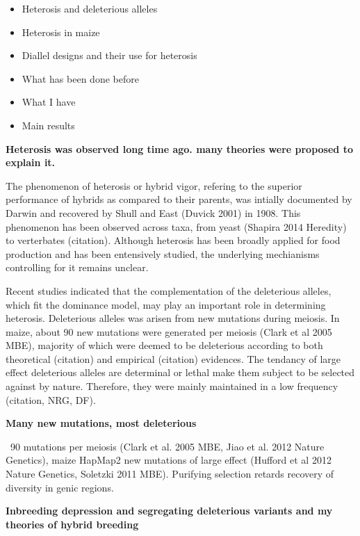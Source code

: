 \documentclass[10pt]{article}
\begin{document}
\begin{itemize}
  \item Heterosis and deleterious alleles
  \item Heterosis in maize
  \item Diallel designs and their use for heterosis
  \item What has been done before
  \item What I have
  \item  Main results
\end{itemize}



\textbf{Heterosis was observed long time ago. many theories were proposed to explain it.}


The phenomenon of heterosis or hybrid vigor, refering to the superior performance of hybrids as compared to their parents, was intially documented by Darwin and recovered by Shull and East (Duvick 2001) in 1908. This phenomenon has been observed across taxa, from yeast (Shapira 2014 Heredity) to verterbates (citation). Although heterosis has been broadly applied for food production and has been entensively studied, the underlying mechianisms controlling for it remains unclear. 

Recent studies indicated that the complementation of the deleterious alleles, which fit the dominance model, may play an important role in determining heterosis. Deleterious alleles was arisen from new mutations during meiosis. In maize, about 90 new mutations were generated per meiosis (Clark et al 2005 MBE), majority of which were deemed to be deleterious according to both theoretical (citation) and empirical (citation) evidences. The tendancy of large effect deleterious alleles are determinal or lethal make them subject to be selected against by nature. Therefore, they were mainly maintained in a low frequency (citation, NRG, DF). 

\textbf{Many new mutations, most deleterious}

~90 mutations per meiosis (Clark et al. 2005 MBE, Jiao et al. 2012 Nature Genetics), maize HapMap2 new mutations of large effect (Hufford et al 2012 Nature Genetics, Soletzki 2011 MBE).
Purifying selection retards recovery of diversity in genic regions.


\textbf{Inbreeding depression and segregating deleterious variants and my theories of hybrid breeding}
\end{document}

